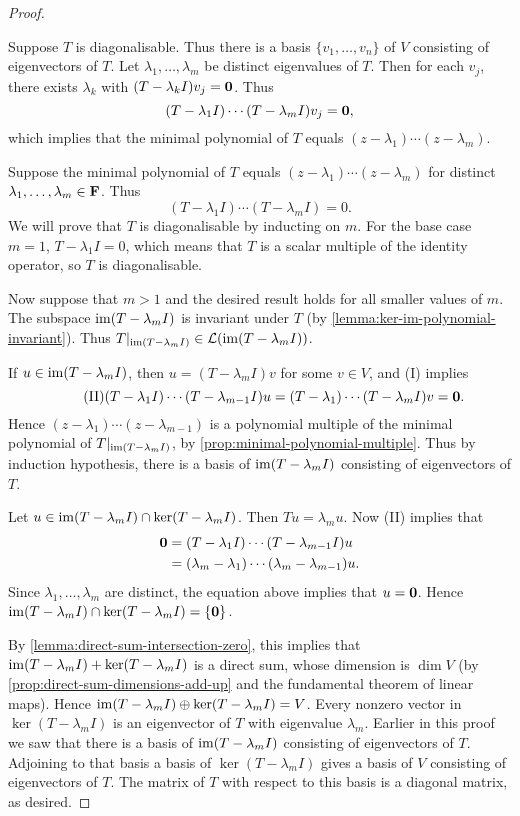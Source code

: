 \begin{proof} \

\forward Suppose $T$ is diagonalisable. Thus there is a basis $\{v_1,\dots,v_n\}$ of $V$ consisting of eigenvectors of $T$. Let $\lambda_1,\dots,\lambda_m$ be distinct eigenvalues of $T$.
Then for each $v_j$, there exists $\lambda_k$ with $(T-\lambda_k I)v_j=\vb{0}$. Thus
\[(T-\lambda_1 I)\cdots(T-\lambda_m I)v_j=\vb{0},\]
which implies that the minimal polynomial of $T$ equals $(z-\lambda_1)\cdots(z-\lambda_m)$.

\backward Suppose the minimal polynomial of $T$ equals $(z-\lambda_1)\cdots(z-\lambda_m)$ for distinct $\lambda_1,\dots,\lambda_m\in\mathbf F$. Thus
\begin{equation*}\tag{I}
(T-\lambda_1 I)\cdots(T-\lambda_m I)=0.
\end{equation*}
We will prove that $T$ is diagonalisable by inducting on $m$. For the base case $m=1$, $T-\lambda_1 I=0$, which means that $T$ is a scalar multiple of the identity operator, so $T$ is diagonalisable.

Now suppose that $m>1$ and the desired result holds for all smaller values of $m$. 
The subspace $\operatorname{im}(T-\lambda_m I)$ is invariant under $T$ (by \ref{lemma:ker-im-polynomial-invariant}). Thus $T|_{\operatorname{im}(T-\lambda_m I)}\in\mathcal{L}(\operatorname{im}(T-\lambda_m I))$.

If $u\in\operatorname{im}(T-\lambda_m I)$, then $u=(T-\lambda_m I)v$ for some $v\in V$, and (I) implies
\begin{equation*}\tag{II}
(T-\lambda_1 I)\cdots(T-\lambda_{m-1}I)u=(T-\lambda_1)\cdots(T-\lambda_m I)v=\vb{0}.
\end{equation*}
Hence $(z-\lambda_1)\cdots(z-\lambda_{m-1})$ is a polynomial multiple of the minimal polynomial of $T|_{\operatorname{im}(T-\lambda_m I)}$, by \ref{prop:minimal-polynomial-multiple}. Thus by induction hypothesis, there is a basis of $\operatorname{im}(T-\lambda_m I)$ consisting of eigenvectors of $T$.

Let $u\in\operatorname{im}(T-\lambda_m I)\cap\ker(T-\lambda_m I)$. Then $Tu=\lambda_m u$. Now (II) implies that
\begin{align*}
\vb{0}&=(T-\lambda_1 I)\cdots(T-\lambda_{m-1}I)u\\
&=(\lambda_m-\lambda_1)\cdots(\lambda_m-\lambda_{m-1})u.
\end{align*}
Since $\lambda_1,\dots,\lambda_m$ are distinct, the equation above implies that $u=\vb{0}$. Hence $\operatorname{im}(T-\lambda_m I)\cap\ker(T-\lambda_m I)=\{\vb{0}\}$.

By \ref{lemma:direct-sum-intersection-zero}, this implies that $\operatorname{im}(T-\lambda_m I)+\ker(T-\lambda_m I)$ is a direct sum, whose dimension is $\dim V$ (by \ref{prop:direct-sum-dimensions-add-up} and the fundamental theorem of linear maps). 
Hence $\operatorname{im}(T-\lambda_m I)\oplus\ker(T-\lambda_m I)=V$. 
Every nonzero vector in $\ker(T-\lambda_m I)$ is an eigenvector of $T$ with eigenvalue $\lambda_m$.
Earlier in this proof we saw that there is a basis of $\operatorname{im}(T-\lambda_m I)$ consisting of eigenvectors of $T$. 
Adjoining to that basis a basis of $\ker(T-\lambda_m I)$ gives a basis of $V$ consisting of eigenvectors of $T$. 
The matrix of $T$ with respect to this basis is a diagonal matrix, as desired.
\end{proof}

